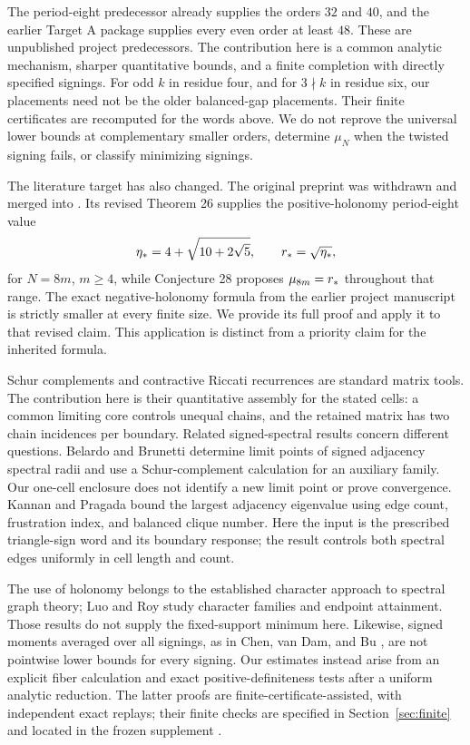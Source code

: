 The period-eight predecessor \cite{EarlierPeriodEight} already supplies the
orders $32$ and $40$, and the earlier Target A package
\cite{EarlierTargetA} supplies every even order at least $48$.
These are unpublished project predecessors. The contribution here is a
common analytic mechanism, sharper quantitative bounds, and a finite
completion with directly specified signings. For odd $k$ in residue four, and for
$3\nmid k$ in residue six, our placements need not be the older balanced-gap
placements. Their finite certificates are recomputed for the words above.
We do not reprove the universal lower bounds at complementary smaller
orders, determine $\mu_N$ when the twisted signing fails, or classify
minimizing signings.

The literature target has also changed. The original preprint
\cite{Suvagiya2026old} was withdrawn and merged into
\cite{Suvagiya2026}. Its revised Theorem 26 supplies the positive-holonomy
period-eight value
\begin{equation}
 \eta_*=4+\sqrt{10+2\sqrt5},\qquad r_*=\sqrt{\eta_*},
 \label{eq:rstar}
\end{equation}
for $N=8m$, $m\ge4$, while Conjecture 28 proposes $\mu_{8m}=r_*$
throughout that range. The exact negative-holonomy formula from the earlier
project manuscript \cite{EarlierPeriodEight} is strictly smaller at every
finite size. We provide its full proof and apply it to that revised claim.
This application is distinct from a priority claim for the inherited formula.

Schur complements and contractive Riccati recurrences are standard matrix
tools. The contribution here is their quantitative assembly for the stated
cells: a common limiting core controls unequal chains, and the retained
matrix has two chain incidences per boundary. Related signed-spectral
results concern different questions. Belardo and Brunetti
\cite[Theorem 1.3 and Lemma 3.8]{BelardoBrunetti2024} determine limit points
of signed adjacency spectral radii and use a Schur-complement calculation
for an auxiliary family. Our one-cell enclosure does not identify a new
limit point or prove convergence. Kannan and Pragada
\cite[Theorem 3.3]{KannanPragada2023} bound the largest adjacency eigenvalue
using edge count, frustration index, and balanced clique number. Here the
input is the prescribed triangle-sign word and its boundary response; the
result controls both spectral edges uniformly in cell length and count.

The use of holonomy belongs to the established character approach to
spectral graph theory; Luo and Roy \cite[Theorems 3.6 and 3.13]{LuoRoy2026}
study character families and endpoint attainment. Those results do not
supply the fixed-support minimum here. Likewise, signed moments averaged
over all signings, as in Chen, van Dam, and Bu
\cite[Theorem 3.1]{ChenDamBu2024}, are not pointwise lower bounds for every
signing. Our estimates instead arise from an explicit fiber calculation
and exact positive-definiteness tests after a uniform analytic reduction.
The latter proofs are finite-certificate-assisted, with independent exact
replays; their finite checks are specified in Section~\ref{sec:finite} and
located in the frozen supplement \cite{C029Supplement}.

